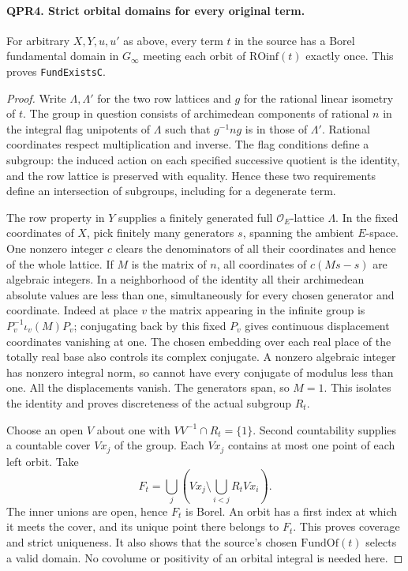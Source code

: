 \paragraph{QPR4. Strict orbital domains for every original term.}
For arbitrary \(X,Y,u,u'\) as above, every term \(t\) in the source
has a Borel fundamental domain in \(G_\infty\) meeting each orbit of
\(\mathrm{ROinf}(t)\) exactly once. This proves \texttt{FundExistsC}.
\begin{proof}
Write \(\Lambda,\Lambda'\) for the two row lattices and \(g\) for the
rational linear isometry of \(t\). The group in question consists of
archimedean components of rational \(n\) in the integral flag
unipotents of \(\Lambda\) such that \(g^{-1}ng\) is in those of
\(\Lambda'\). Rational coordinates respect multiplication and inverse.
The flag conditions define a subgroup: the induced action on each
specified successive quotient is the identity, and the row lattice is
preserved with equality. Hence these two requirements define an
intersection of subgroups, including for a degenerate term.

The row property in \(Y\) supplies a finitely generated full
\(\mathcal O_E\)-lattice \(\Lambda\). In the fixed coordinates of
\(X\), pick finitely many generators \(s\), spanning the ambient
\(E\)-space. One nonzero integer \(c\) clears the denominators of
all their coordinates and hence of the whole lattice. If \(M\) is the
matrix of \(n\), all coordinates of \(c(Ms-s)\) are algebraic
integers. In a neighborhood of the identity all their archimedean
absolute values are less than one, simultaneously for every chosen
generator and coordinate. Indeed at place \(v\) the matrix appearing
in the infinite group is \(P_v^{-1}\iota_v(M)P_v\); conjugating back
by this fixed \(P_v\) gives continuous displacement coordinates
vanishing at one. The chosen embedding over each real place of the
totally real base also controls its complex conjugate. A nonzero
algebraic integer has nonzero integral norm, so cannot have every
conjugate of modulus less than one. All the displacements vanish.
The generators span, so \(M=1\). This isolates the identity and
proves discreteness of the actual subgroup \(R_t\).

Choose an open \(V\) about one with \(VV^{-1}\cap R_t=\{1\}\).
Second countability supplies a countable cover \(Vx_j\) of the
group. Each \(Vx_j\) contains at most one point of each left orbit.
Take
\[
 F_t=\bigcup_j\left(Vx_j\setminus\bigcup_{i<j} R_t Vx_i\right).
\]
The inner unions are open, hence \(F_t\) is Borel. An orbit has a
first index at which it meets the cover, and its unique point there
belongs to \(F_t\). This proves coverage and strict uniqueness. It
also shows that the source's chosen \(\mathrm{FundOf}(t)\) selects
a valid domain. No covolume or positivity of an orbital integral is
needed here.
\end{proof}

